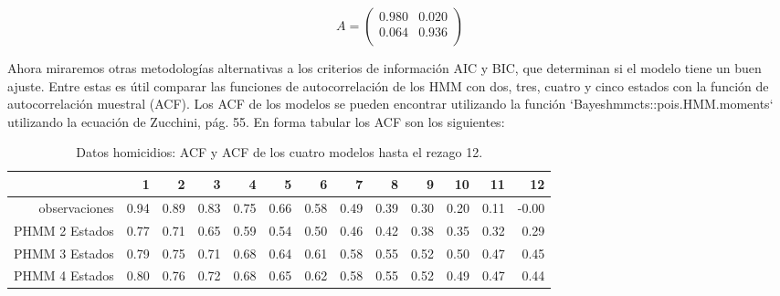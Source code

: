 \documentclass[a4paper]{article}\usepackage[]{graphicx}\usepackage[]{color}
\begin{document}
$$
A = \begin{pmatrix}{}
  0.980 & 0.020 \\ 
  0.064 & 0.936 \\ 
\end{pmatrix}
$$

Ahora miraremos otras metodologías alternativas a los criterios de información AIC y BIC, que determinan si el modelo tiene un buen ajuste. Entre estas es útil comparar las funciones de autocorrelación de los HMM con dos, tres, cuatro y cinco estados con la función de autocorrelación muestral (ACF). Los ACF de los modelos se pueden encontrar utilizando la función `Bayeshmmcts::pois.HMM.moments` utilizando la ecuación de Zucchini, pág. 55. En forma tabular los ACF son los siguientes:

\begin{table}[ht]
\centering
\begin{tabular}{rrrrrrrrrrrrr}
  \hline
 & 1 & 2 & 3 & 4 & 5 & 6 & 7 & 8 & 9 & 10 & 11 & 12 \\ 
  \hline
observaciones & 0.94 & 0.89 & 0.83 & 0.75 & 0.66 & 0.58 & 0.49 & 0.39 & 0.30 & 0.20 & 0.11 & -0.00 \\ 
  PHMM 2 Estados & 0.77 & 0.71 & 0.65 & 0.59 & 0.54 & 0.50 & 0.46 & 0.42 & 0.38 & 0.35 & 0.32 & 0.29 \\ 
  PHMM 3 Estados & 0.79 & 0.75 & 0.71 & 0.68 & 0.64 & 0.61 & 0.58 & 0.55 & 0.52 & 0.50 & 0.47 & 0.45 \\ 
  PHMM 4 Estados & 0.80 & 0.76 & 0.72 & 0.68 & 0.65 & 0.62 & 0.58 & 0.55 & 0.52 & 0.49 & 0.47 & 0.44 \\ 
   \hline
\end{tabular}
\caption{Datos homicidios: ACF y ACF de los cuatro modelos hasta el rezago 12.} 
\end{table}
\end{document}
